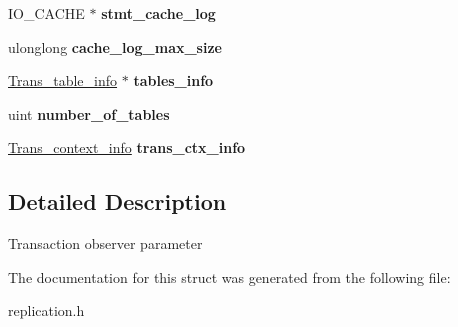 \begin{DoxyCompactItemize}
\mbox{\label{structTrans__param_ab2d5298796cc778a450f690bf59beb84}} 
I\+O\+\_\+\+C\+A\+C\+HE $\ast$ {\bfseries stmt\+\_\+cache\+\_\+log}
\item 
\mbox{\label{structTrans__param_a325560154d70934c3d5bd33f256844f2}} 
ulonglong {\bfseries cache\+\_\+log\+\_\+max\+\_\+size}
\item 
\mbox{\label{structTrans__param_add465273aa83b6c1296d6578ac7d626c}} 
\mbox{\hyperlink{structTrans__table__info}{Trans\+\_\+table\+\_\+info}} $\ast$ {\bfseries tables\+\_\+info}
\item 
\mbox{\label{structTrans__param_aaceaca1b9a8a4bd39ab5815e14d23c49}} 
uint {\bfseries number\+\_\+of\+\_\+tables}
\item 
\mbox{\label{structTrans__param_a8b8fbc79e196d361e2a79d878f169239}} 
\mbox{\hyperlink{structTrans__context__info}{Trans\+\_\+context\+\_\+info}} {\bfseries trans\+\_\+ctx\+\_\+info}
\end{DoxyCompactItemize}


\subsection{Detailed Description}
Transaction observer parameter 

The documentation for this struct was generated from the following file\+:\begin{DoxyCompactItemize}
\item 
replication.\+h\end{DoxyCompactItemize}

